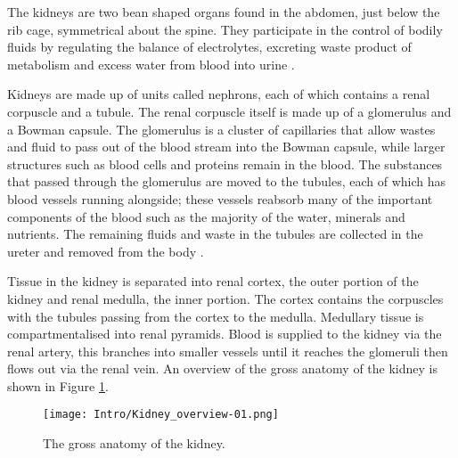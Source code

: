 The kidneys are two bean shaped organs found in the abdomen, just below the rib cage, symmetrical about the spine. They participate in the control of bodily fluids by regulating the balance of electrolytes, excreting waste product of metabolism and excess water from blood into urine \cite{lote_principles_2012}. 

Kidneys are made up of units called nephrons, each of which contains a renal corpuscle and a tubule. The renal corpuscle itself is made up of a glomerulus and a Bowman capsule. The glomerulus is a cluster of capillaries that allow wastes and fluid to pass out of the blood stream into the Bowman capsule, while larger structures such as blood cells and proteins remain in the blood. The substances that passed through the glomerulus are moved to the tubules, each of which has blood vessels running alongside; these vessels reabsorb many of the important components of the blood such as the majority of the water, minerals and nutrients. The remaining fluids and waste in the tubules are collected in the ureter and removed from the body \cite{hall_guyton_2015}.

Tissue in the kidney is separated into renal cortex, the outer portion of the kidney and renal medulla, the inner portion. The cortex contains the corpuscles with the tubules passing from the cortex to the medulla. Medullary tissue is compartmentalised into renal pyramids. Blood is supplied to the kidney via the renal artery, this branches into smaller vessels until it reaches the glomeruli then flows out via the renal vein. An overview of the gross anatomy of the kidney is shown in Figure \ref{fig:intro_kidney_overview}.

\begin{figure}[H]
	\centering
	\texttt{[image: Intro/Kidney\_overview-01.png]}
	\caption{The gross anatomy of the kidney.}
	\label{fig:intro_kidney_overview}	
\end{figure}


